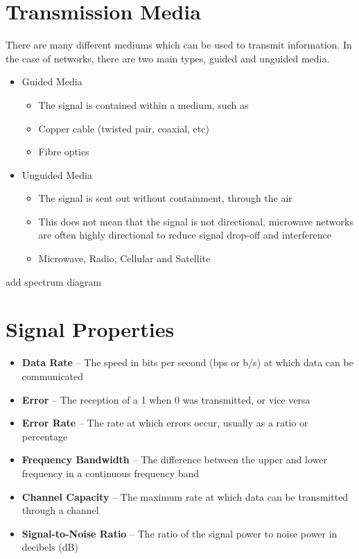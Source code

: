 
\section*{Transmission Media}

There are many different mediums which can be used to transmit information. In the case of networks, there are two main
 types, guided and unguided media.

\begin{itemize}
  \item Guided Media
  \begin{itemize}
    \item The signal is contained within a medium, such as
    \item Copper cable (twisted pair, coaxial, etc)
    \item Fibre optics
  \end{itemize}
  \item Unguided Media
  \begin{itemize}
    \item The signal is sent out without containment, through the air
    \item This does not mean that the signal is not directional, microwave networks are often highly directional to
     reduce signal drop-off and interference
    \item Microwave, Radio, Cellular and Satellite
  \end{itemize}
\end{itemize}

{\huge add spectrum diagram}

\section*{Signal Properties}

\begin{itemize}
  \item \textbf{Data Rate} -- The speed in bits per second (bps or b/s) at which data can be communicated
  \item \textbf{Error} -- The reception of a 1 when 0 was transmitted, or vice versa
  \item \textbf{Error Rate} -- The rate at which errors occur, usually as a ratio or percentage
  \item \textbf{Frequency Bandwidth} -- The difference between the upper and lower frequency in a continuous frequency
   band
  \item \textbf{Channel Capacity} -- The maximum rate at which data can be transmitted through a channel 
  \item \textbf{Signal-to-Noise Ratio} -- The ratio of the signal power to noise power in decibels (dB)
\end{itemize}


